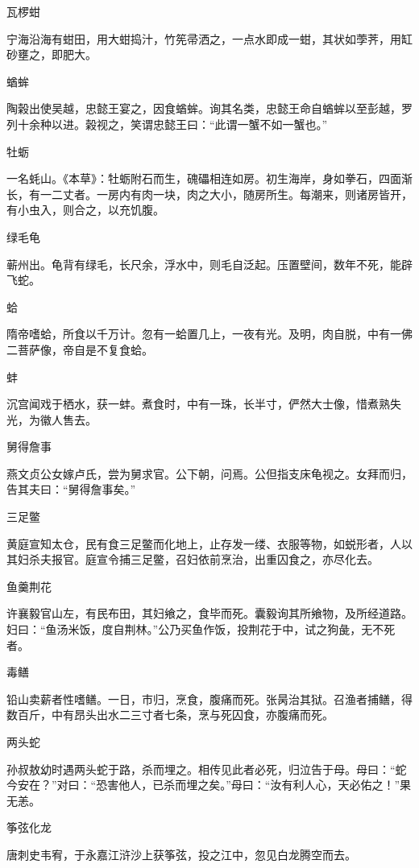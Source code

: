 \documentclass[a4paper,12pt,UTF8,twoside]{ctexbook}
\begin{document}
    瓦椤蚶
    
    宁海沿海有蚶田，用大蚶捣汁，竹筅帚洒之，一点水即成一蚶，其状如荸荠，用缸砂壅之，即肥大。
    
    蝤蛑
    
    陶榖出使吴越，忠懿王宴之，因食蝤蛑。询其名类，忠懿王命自蝤蛑以至彭越，罗列十余种以进。榖视之，笑谓忠懿王曰：“此谓一蟹不如一蟹也。”
    
    牡蛎
    
    一名蚝山。《本草》：牡蛎附石而生，磈礧相连如房。初生海岸，身如拳石，四面渐长，有一二丈者。一房内有肉一块，肉之大小，随房所生。每潮来，则诸房皆开，有小虫入，则合之，以充饥腹。
    
    绿毛龟
    
    蕲州出。龟背有绿毛，长尺余，浮水中，则毛自泛起。压置壁间，数年不死，能辟飞蛇。
    
    蛤
    
    隋帝嗜蛤，所食以千万计。忽有一蛤置几上，一夜有光。及明，肉自脱，中有一佛二菩萨像，帝自是不复食蛤。
    
    蚌
    
    沉宫闻戏于栖水，获一蚌。煮食时，中有一珠，长半寸，俨然大士像，惜煮熟失光，为徽人售去。
    
    舅得詹事
    
    燕文贞公女嫁卢氏，尝为舅求官。公下朝，问焉。公但指支床龟视之。女拜而归，告其夫曰：“舅得詹事矣。”
    
    三足鳖
    
    黄庭宣知太仓，民有食三足鳖而化地上，止存发一缕、衣服等物，如蜕形者，人以其妇杀夫报官。庭宣令捕三足鳖，召妇依前烹治，出重囚食之，亦尽化去。
    
    鱼羹荆花
    
    许襄毅官山左，有民布田，其妇飨之，食毕而死。囊毅询其所飨物，及所经道路。妇曰：“鱼汤米饭，度自荆林。”公乃买鱼作饭，投荆花于中，试之狗彘，无不死者。
    
    毒鳝
    
    铅山卖薪者性嗜鳝。一日，市归，烹食，腹痛而死。张昺治其狱。召渔者捕鳝，得数百斤，中有昂头出水二三寸者七条，烹与死囚食，亦腹痛而死。
    
    两头蛇
    
    孙叔敖幼时遇两头蛇于路，杀而埋之。相传见此者必死，归泣告于母。母曰：“蛇今安在？”对曰：“恐害他人，已杀而埋之矣。”母曰：“汝有利人心，天必佑之！”果无恙。
    
    筝弦化龙
    
    唐刺史韦宥，于永嘉江浒沙上获筝弦，投之江中，忽见白龙腾空而去。
    
\end{document}
